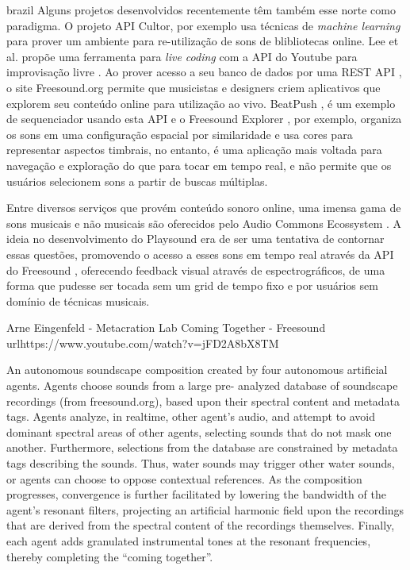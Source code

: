 \begin{otherlanguage*}{brazil}
Alguns projetos desenvolvidos recentemente têm também esse norte como paradigma. O projeto API Cultor, por exemplo \cite{Ordiales2017} usa técnicas de \emph{machine learning} para prover um ambiente para re-utilização de sons de blibliotecas online. Lee et al. propõe uma ferramenta para \emph{live coding} com a API do Youtube para improvisação livre \cite{Lee}. Ao prover acesso a seu banco de dados por uma REST API \cite{Akkermans2011}, o site Freesound.org permite que musicistas e designers criem aplicativos que explorem seu conteúdo online para utilização ao vivo. BeatPush \cite{Feenstra2016}, é um exemplo de sequenciador usando esta API e o Freesound Explorer \cite{Font2016}, por exemplo, organiza os sons em uma configuração espacial por similaridade e usa cores para representar aspectos timbrais, no entanto, é uma aplicação mais voltada para navegação e exploração do que para tocar em tempo real, e não permite que os usuários selecionem sons a partir de buscas múltiplas. 


Entre diversos serviços que provém conteúdo sonoro online, uma imensa gama de sons musicais e não musicais são oferecidos pelo Audio Commons Ecossystem \cite{Font2015}. A ideia no desenvolvimento do Playsound era de ser uma tentativa de contornar essas questões, promovendo o acesso a esses sons em tempo real através da API do Freesound \cite{Akkermans2011}, oferecendo feedback visual através de espectrográficos, de uma forma que pudesse ser tocada sem um grid de tempo fixo e por usuários sem domínio de técnicas musicais.


Arne Eingenfeld - Metacration Lab
Coming Together - Freesound
url{https://www.youtube.com/watch?v=jFD2A8bX8TM}

An autonomous soundscape composition created by four autonomous artificial agents. Agents choose sounds from a large pre- analyzed database of soundscape recordings (from freesound.org), based upon their spectral content and metadata tags. Agents analyze, in realtime, other agent's audio, and attempt to avoid dominant spectral areas of other agents, selecting sounds that do not mask one another. Furthermore, selections from the database are constrained by metadata tags describing the sounds. Thus, water sounds may trigger other water sounds, or agents can choose to oppose contextual references. As the composition progresses, convergence is further facilitated by lowering the bandwidth of the agent's resonant filters, projecting an artificial harmonic field upon the recordings that are derived from the spectral content of the recordings themselves. Finally, each agent adds granulated instrumental tones at the resonant frequencies, thereby completing the ``coming together''. \cite{Arneeigenfeldt2010}


\end{otherlanguage*}

